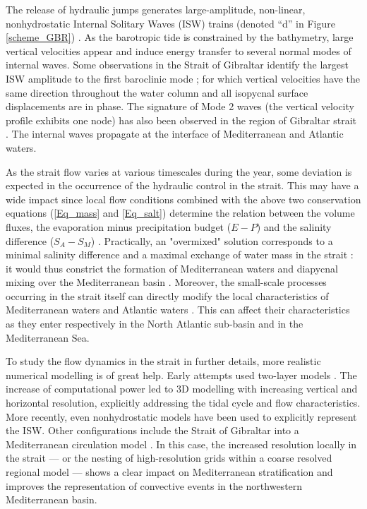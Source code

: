 The release of hydraulic jumps generates large-amplitude, non-linear, nonhydrostatic Internal Solitary Waves (ISW) trains (denoted ``d'' in Figure \ref{scheme_GBR}) \citep{FA1988}. As the barotropic tide is constrained by the bathymetry, large vertical velocities appear and induce energy transfer to several normal modes of internal waves. Some observations in the Strait of Gibraltar identify the largest ISW amplitude to the first baroclinic mode ; for which vertical velocities have the same direction throughout the water column and all isopycnal surface displacements are in phase. The signature of Mode 2 waves (the vertical velocity profile exhibits one node) has also been observed in the region of Gibraltar strait \citep{FA1988,Vazquez2006}. The internal waves propagate at the interface of Mediterranean and Atlantic waters. 

As the strait flow varies at various timescales during the year, some deviation is expected in the occurrence of the hydraulic control in the strait. This may have a wide impact since local flow conditions combined with the above two conservation equations (\ref{Eq_mass} and \ref{Eq_salt}) determine the relation between the volume fluxes, the evaporation minus precipitation budget ($E-P$) and the salinity difference ($S_A-S_M$) \citep{BK91}. Practically, an "overmixed" solution corresponds to a minimal salinity difference and a maximal exchange of water mass in the strait : it would thus constrict the formation of Mediterranean waters and diapycnal mixing over the Mediterranean basin \citep{BS84,Garett90}. Moreover, the small-scale processes occurring in the strait itself can directly modify the local characteristics of Mediterranean waters \citep{GarciaLafuente2011, Naranjo2015} and Atlantic waters \citep{Millot2014}. This can affect their characteristics as they enter respectively in the North Atlantic sub-basin and in the Mediterranean Sea. 

To study the flow dynamics in the strait in further details, more realistic numerical modelling is of great help. Early attempts used two-layer models  \citep{Brandt1996, Izquierdo2001}. The increase of computational power led to 3D modelling \citep{Sannino2004} with increasing vertical and horizontal resolution, explicitly addressing the tidal cycle and flow characteristics. More recently, even nonhydrostatic models have been used \citep{SG2011, Sannino2014} to explicitly represent the ISW. Other configurations include the Strait of Gibraltar into a Mediterranean circulation model \citep{SN2015}. In this case, the increased resolution locally in the strait \citep{Naranjo2014} --- or the nesting of high-resolution grids within a coarse resolved regional model \citep{Sannino2009} --- shows a clear impact on Mediterranean stratification and improves the representation of convective events in the northwestern Mediterranean basin.

